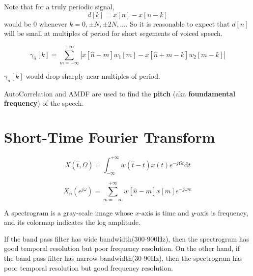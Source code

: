 Note that for a truly periodic signal,
\[ d[k] = x[n] -x[n-k] \]
would be $0$ whenever $k=0,\pm N, \pm 2N, \dots$. So it is reasonable to expect that $d[n]$ will be small at multiples of period for short segements of voiced speech.
\begin{definition}
    \[ \gamma_{\hat{n}}[k] = \sum_{m=-\infty}^{+\infty} |x[\hat{n}+m]w_1[m] - x[\hat{n}+m-k]w_2[m-k] | \]
\end{definition}
\begin{remark}
    $\gamma_{\hat{n}}[k]$ would drop sharply near multiples of period.
\end{remark}

AutoCorrelation and AMDF are used to find the \textbf{pitch} (aka \textbf{foundamental frequency}) of the speech.

\section{Short-Time Fourier Transform}
\begin{definition}
    \[ X(\hat{t}, \Omega) = \int_{-\infty}^{+\infty} w(\hat{t}- t)x(t)e^{-j\Omega t}\mathrm{d}t \]
\end{definition}
\begin{definition}
    \[ X_{\hat{n}}(e^{j\omega}) = \sum_{m=-\infty}^{+\infty}w[\hat{n}-m]x[m]e^{-j\omega m} \]
\end{definition}
\begin{definition}[Spectrogram]
    A spectrogram is a gray-scale image whose $x$-axis is time and $y$-axis is frequency, and its colormap indicates the log amplitude.
\end{definition}
\begin{remark}
    If the band pass filter has wide bandwidth(300-900Hz), then the spectrogram has good temporal resolution but poor frequency resolution. On the other hand, if the band pass filter has narrow bandwidth(30-90Hz), then the spectrogram has poor temporal resolution but good frequency resolution.
\end{remark}